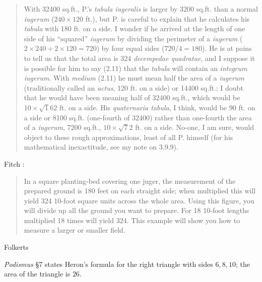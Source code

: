 \begin{quote}
With 32400 sq.ft., P.'s {\em tabula iugeralis} is larger by 3200 sq.ft. than a normal {\em iugerum} ($240 \times 120$ ft.),
but P. is careful to explain that he calculates his {\em tabula} with 180 ft. on a side. I wonder if he arrived at the length of one side
of his ``squared'' {\em iugerum} by dividing the perimeter of a {\em iugerum} ($2 \times 240+2 \times 120=720$) by four equal
sides ($720/4=180$). He is at pains to tell us that the total area is 324 {\em decempedae quadratae}, and I suppose  it is
possible for him to say (2.11) that the {\em tabula} will contain an {\em integrum iugerum}. With {\em medium} (2.11) he must mean
half the area of a {\em iugerum} (traditionally called an {\em actus}, 120 ft. on a side) or 14400 sq.ft.; I doubt that he would
have been meaning half of 32400 sq.ft., which would be $10 \times \surd 162$ ft. on a side. His {\em quaternaria tabula}, I think,
would be 90 ft. on a side or 8100 sq.ft. (one-fourth of 32400) rather than one-fourth the area of a {\em iugerum}, 7200 sq.ft.,
$10 \times \surd 72$ ft. on a side. No-one, I am sure, would object to these rough approximations, least of all P. himself (for his mathematical inexactitude, see my note
on 3.9.9).
\end{quote}

Fitch \cite[p.~75]{fitch}:

\begin{quote}
In a square planting-bed covering one juger, the measurement of the prepared ground is 180 feet on each straight side; when multiplied this will yield 324 10-foot square units across the whole area. Using this figure, you will divide up all the ground you want to prepare. For 18 10-foot lengths multiplied 18 times will yield 324.
This example will show you how to measure a larger or smaller field.
\end{quote}

Folkerts \cite{folkerts}

{\em Podismus} \S 7 \cite[pp.~134--137]{guillaumin} states Heron's formula for the right triangle with sides
$6,8,10$; the area of the triangle is $26$.  

